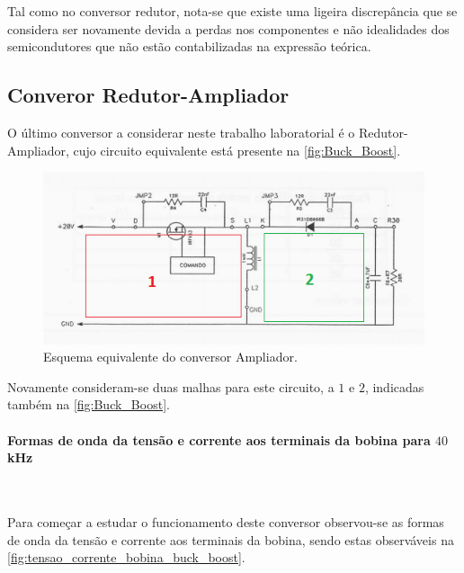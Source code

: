 \documentclass[a4paper,11pt]{article}
\numberwithin{equation}{section}
\begin{document}
Tal como no conversor redutor, nota-se que existe uma ligeira discrepância que se considera ser novamente devida a perdas nos componentes e não idealidades dos semicondutores que não estão contabilizadas na expressão teórica.

\subsection{Converor Redutor-Ampliador}

O último conversor a considerar neste trabalho laboratorial é o Redutor-Ampliador, cujo circuito equivalente está presente na \autoref{fig:Buck_Boost}.

\begin{figure}[H]
	\centering
	\includegraphics[keepaspectratio=true, scale=1]{teoricas/Buck_Boost}
	\caption{Esquema equivalente do conversor Ampliador.}
	\label{fig:Buck_Boost}
	\vspace{-0.8em}
\end{figure}

Novamente consideram-se duas malhas para este circuito, a $1$ e $2$, indicadas também na \autoref{fig:Buck_Boost}.

\paragraph{Formas de onda da tensão e corrente aos terminais da bobina para $40$ kHz}\mbox{}\

Para começar a estudar o funcionamento deste conversor observou-se as formas de onda da tensão e corrente aos terminais da bobina, sendo estas observáveis na \autoref{fig:tensao_corrente_bobina_buck_boost}.
\end{document}
